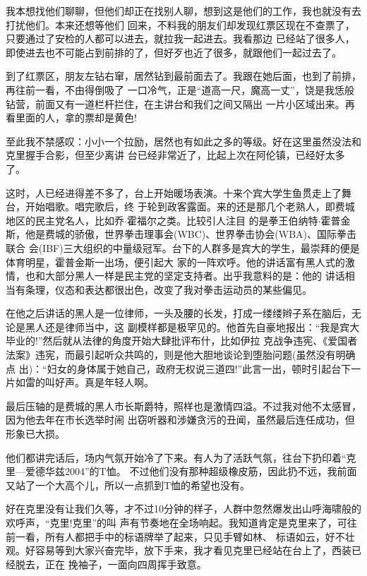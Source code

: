 ﻿\documentclass[11pt]{article}
\begin{document}
我本想找他们聊聊，但他们却正在找别人聊，想到这是他们的工作，我也就没有去打扰他们。本来还想等他们
回来，不料我的朋友们却发现红票区现在不查票了，只要通过了安检的人都可以进去，就拉我一起进去。我看那边
已经站了很多人，即使进去也不可能占到前排的了，但好歹也近了很多，就跟他们一起过去了。

到了红票区，朋友左钻右窜，居然钻到最前面去了。我跟在她后面，也到了前排，再往前一看，不由得倒吸了
一口冷气，正是``道高一尺，魔高一丈''，饶是我恁般钻营，前面又有一道栏杆拦住，在主讲台和我们之间又隔出
一片小区域出来。再看里面的人，拿的票却是黄色!

至此我不禁感叹：小小一个拉励，居然也有如此之多的等级。好在这里虽然没法和克里握手合影，但至少离讲
台已经非常近了，比起上次在阿伦镇，已经好太多了。

这时，人已经进得差不多了，台上开始暖场表演。十来个宾大学生鱼贯走上了舞台，开始唱歌。唱完歌后，终
于轮到政客露面。来的还是那几个老熟人，即费城地区的民主党名人，比如乔$\cdot$霍福尔之类。比较引人注目
的是拳王伯纳特$\cdot$霍普金斯，他是费城的骄傲，世界拳击理事会(WBC)、世界拳击协会(WBA)、国际拳击联合
会(IBF)三大组织的中量级冠军。台下的人群多是宾大的学生，最崇拜的便是体育明星，霍普金斯一出场，便引起大
家的一阵欢呼。他的讲话富有黑人式的激情，也和大部分黑人一样是民主党的坚定支持者。出乎我意料的是：他的
讲话相当有条理，仪态和表达都很出色，改变了我对拳击运动员的某些偏见。

在他之后讲话的黑人是一位律师，一头及腰的长发，打成一缕缕辫子系在脑后，无论是黑人还是律师当中，这
副模样都是极罕见的。他首先自豪地报出：``我是宾大毕业的!''然后就从法律的角度开始大肆批评布什，比如伊拉
克战争违宪、《爱国者法案》违宪，而最引起听众共鸣的，则是他大胆地谈论到堕胎问题(虽然没有明确点
出)：``妇女的身体属于她自己，政府无权说三道四!''此言一出，顿时引起台下一片如雷的叫好声。真是年轻人啊。


最后压轴的是费城的黑人市长斯爵特，照样也是激情四溢。不过我对他不太感冒，因为他去年在市长选举时闹
出窃听器和涉嫌贪污的丑闻，虽然最后连任成功，但形象已大损。

他们都讲完话后，场内气氛开始冷了下来。有人为了活跃气氛，往台下扔印着``克里---爱德华兹2004''的T恤。
不过他们没有那种超级橡皮筋，因此扔不远，我前面又站了一个大高个儿，所以一点抓到T恤的希望也没有。

好在克里没有让我们久等，才不过10分钟的样子，人群中忽然爆发出山呼海啸般的欢呼声，``克里!克里''的叫
声有节奏地在全场响起。我知道肯定是克里来了，可往前一看，所有人都把手中的标语牌举了起来，只见手臂如林、
标语如云，好不壮观。好容易等到大家兴奋完毕，放下手来，我才看见克里已经站在台上了，西装已经脱去，正在
挽袖子，一面向四周挥手致意。
\end{document}
